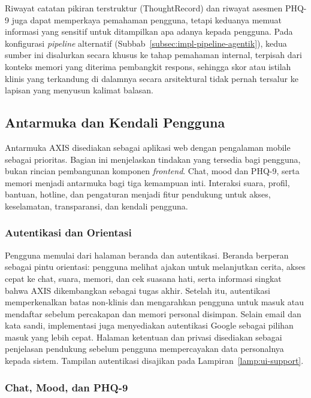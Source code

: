 Riwayat catatan pikiran terstruktur (ThoughtRecord) dan riwayat asesmen PHQ-9 juga dapat memperkaya pemahaman pengguna, tetapi keduanya memuat informasi yang sensitif untuk ditampilkan apa adanya kepada pengguna. Pada konfigurasi \textit{pipeline} alternatif (Subbab~\ref{subsec:impl-pipeline-agentik}), kedua sumber ini disalurkan secara khusus ke tahap pemahaman internal, terpisah dari konteks memori yang diterima pembangkit respons, sehingga skor atau istilah klinis yang terkandung di dalamnya secara arsitektural tidak pernah tersalur ke lapisan yang menyusun kalimat balasan.

\subsection{Antarmuka dan Kendali Pengguna}
\label{sec:hasil-implementasi}

Antarmuka AXIS disediakan sebagai aplikasi web dengan pengalaman mobile sebagai prioritas. Bagian ini menjelaskan tindakan yang tersedia bagi pengguna, bukan rincian pembangunan komponen \textit{frontend}. Chat, mood dan PHQ-9, serta memori menjadi antarmuka bagi tiga kemampuan inti. Interaksi suara, profil, bantuan, hotline, dan pengaturan menjadi fitur pendukung untuk akses, keselamatan, transparansi, dan kendali pengguna.

\subsubsection{Autentikasi dan Orientasi}
\label{subsec:impl-auth}

Pengguna memulai dari halaman beranda dan autentikasi. Beranda berperan sebagai pintu orientasi: pengguna melihat ajakan untuk melanjutkan cerita, akses cepat ke chat, suara, memori, dan cek suasana hati, serta informasi singkat bahwa AXIS dikembangkan sebagai tugas akhir. Setelah itu, autentikasi memperkenalkan batas non-klinis dan mengarahkan pengguna untuk masuk atau mendaftar sebelum percakapan dan memori personal disimpan. Selain email dan kata sandi, implementasi juga menyediakan autentikasi Google sebagai pilihan masuk yang lebih cepat. Halaman ketentuan dan privasi disediakan sebagai penjelasan pendukung sebelum pengguna mempercayakan data personalnya kepada sistem. Tampilan autentikasi disajikan pada Lampiran~\ref{lamp:ui-support}.

\subsubsection{Chat, Mood, dan PHQ-9}
\label{subsec:impl-chat}

